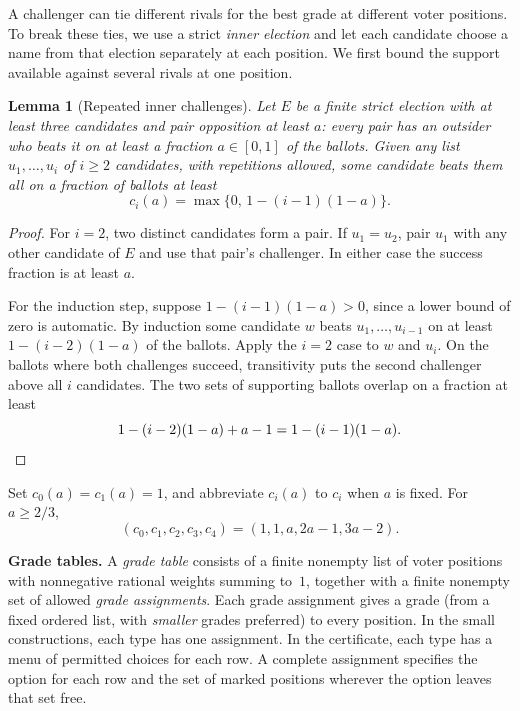 \documentclass[11pt,letterpaper]{article}
\theoremstyle{cleanthm}
\newtheorem{lemma}{Lemma}
\newcommand{\lead}[1]{\textbf{#1}\enspace}
\begin{document}
A challenger can tie different rivals for the best grade at different voter positions. To break
these ties, we use a strict \emph{inner election} and let each candidate choose a name from that
election separately at each position. We first bound the support available against several rivals
at one position.

\begin{lemma}[Repeated inner challenges]\label{lem:transitive}
Let \(E\) be a finite strict election with at least three candidates and \emph{pair opposition at
least \(a\)}: every pair has an outsider who beats it on at least a fraction \(a\in[0,1]\) of the
ballots. Given any list \(u_1,\ldots,u_i\) of \(i\ge2\) candidates, with repetitions allowed, some
candidate beats them all on a fraction of ballots at least
\[
     c_i(a)=\max\{0,\,1-(i-1)(1-a)\}.
\]
\end{lemma}

\begin{proof}
For \(i=2\), two distinct candidates form a pair. If \(u_1=u_2\), pair \(u_1\) with any other
candidate of \(E\) and use that pair's challenger. In either case the success fraction is at least
\(a\).

For the induction step, suppose \(1-(i-1)(1-a)>0\), since a lower bound of zero is automatic. By
induction some candidate \(w\) beats \(u_1,\ldots,u_{i-1}\) on at least \(1-(i-2)(1-a)\) of the
ballots. Apply the \(i=2\) case to \(w\) and \(u_i\). On the ballots where both challenges
succeed, transitivity puts the second challenger above all \(i\) candidates. The two sets of
supporting ballots overlap on a fraction at least
\[
 1-(i-2)(1-a)+a-1 = 1-(i-1)(1-a). \qedhere
\]
\end{proof}

Set \(c_0(a)=c_1(a)=1\), and abbreviate \(c_i(a)\) to \(c_i\) when \(a\) is fixed. For \(a\ge 2/3\),
\begin{equation}\label{eq:tie-credits}
 (c_0,c_1,c_2,c_3,c_4)=(1,1,a,2a-1,3a-2).
\end{equation}

\lead{Grade tables.}
A \emph{grade table} consists of a finite nonempty list of voter positions with nonnegative
rational weights summing to~\(1\), together with a finite nonempty set of allowed \emph{grade
assignments}. Each grade assignment gives a grade (from a fixed ordered list, with \emph{smaller}
grades preferred) to every position. In the small constructions, each type has one assignment. In
the certificate, each type has a menu of permitted choices for each row. A complete assignment
specifies the option for each row and the set of marked positions wherever the option leaves that
set free.
\end{document}
